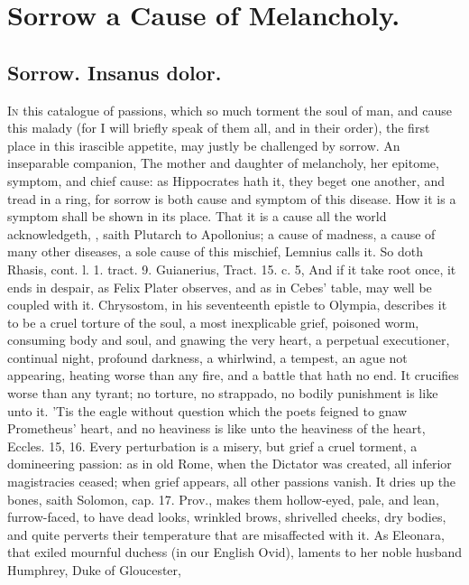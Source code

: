 {%
\section{Sorrow a Cause of Melancholy.}

\subsection{Sorrow. Insanus dolor.}
\lettrine{I}{n} this catalogue of passions, which so much torment the soul of man, and cause
this malady (for I will briefly speak of them all, and in their order), the
first place in this irascible appetite, may justly be challenged by sorrow. An
inseparable companion, The mother and daughter of melancholy,
her epitome, symptom, and chief cause: as Hippocrates hath it, they beget one
another, and tread in a ring, for sorrow is both cause and symptom of this
disease. How it is a symptom shall be shown in its place.
That it is a cause all the world acknowledgeth, , saith Plutarch to Apollonius; a
cause of madness, a cause of many other diseases, a sole cause of this
mischief, Lemnius calls it. So doth Rhasis, cont. l. 1. tract. 9.
Guianerius, Tract. 15. c. 5, And if it take root once, it ends in
despair, as Felix Plater observes, and as in Cebes' table,
may well be coupled with it. Chrysostom, in his seventeenth
epistle to Olympia, describes it to be a cruel torture of the soul, a
most inexplicable grief, poisoned worm, consuming body and soul, and
gnawing the very heart, a perpetual executioner, continual night,
profound darkness, a whirlwind, a tempest, an ague not appearing,
heating worse than any fire, and a battle that hath no end. It
crucifies worse than any tyrant; no torture, no strappado, no bodily
punishment is like unto it. 'Tis the eagle without question which the
poets feigned to gnaw Prometheus' heart, and no heaviness is like
unto the heaviness of the heart, Eccles.  15, 16. Every
perturbation is a misery, but grief a cruel torment, a domineering
passion: as in old Rome, when the Dictator was created, all inferior
magistracies ceased; when grief appears, all other passions vanish. It
dries up the bones, saith Solomon, cap. 17. Prov., makes them
hollow-eyed, pale, and lean, furrow-faced, to have dead looks, wrinkled
brows, shrivelled cheeks, dry bodies, and quite perverts their
temperature that are misaffected with it. As Eleonara, that exiled
mournful duchess (in our English Ovid), laments to her noble
husband Humphrey, Duke of Gloucester,

}
